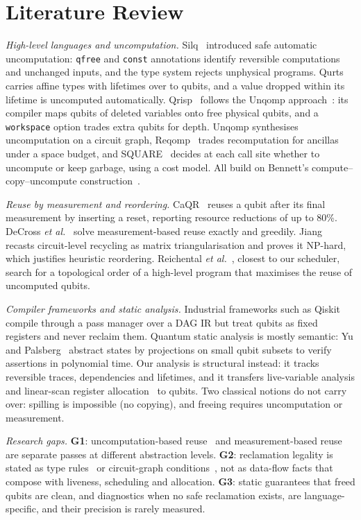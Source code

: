 \documentclass[conference,a4paper]{IEEEtran}
\begin{document}
\section{Literature Review}
\emph{High-level languages and uncomputation.} Silq~\cite{silq} introduced safe automatic uncomputation: \texttt{qfree} and \texttt{const} annotations identify reversible computations and unchanged inputs, and the type system rejects unphysical programs. Qurts~\cite{qurts} carries affine types with lifetimes over to qubits, and a value dropped within its lifetime is uncomputed automatically. Qrisp~\cite{qrisp} follows the Unqomp approach~\cite{unqomp}: its compiler maps qubits of deleted variables onto free physical qubits, and a \texttt{workspace} option trades extra qubits for depth. Unqomp synthesises uncomputation on a circuit graph, Reqomp~\cite{reqomp} trades recomputation for ancillas under a space budget, and SQUARE~\cite{square} decides at each call site whether to uncompute or keep garbage, using a cost model. All build on Bennett's compute--copy--uncompute construction~\cite{bennett1973}.

\emph{Reuse by measurement and reordering.} CaQR~\cite{caqr} reuses a qubit after its final measurement by inserting a reset, reporting resource reductions of up to 80\%. DeCross \emph{et al.}~\cite{decross2023} solve measurement-based reuse exactly and greedily. Jiang~\cite{jiang2024} recasts circuit-level recycling as matrix triangularisation and proves it NP-hard, which justifies heuristic reordering. Reichental \emph{et al.}~\cite{classiq2025}, closest to our scheduler, search for a topological order of a high-level program that maximises the reuse of uncomputed qubits.

\emph{Compiler frameworks and static analysis.} Industrial frameworks such as Qiskit~\cite{qiskit2024} compile through a pass manager over a DAG IR but treat qubits as fixed registers and never reclaim them. Quantum static analysis is mostly semantic: Yu and Palsberg~\cite{yupalsberg2021} abstract states by projections on small qubit subsets to verify assertions in polynomial time. Our analysis is structural instead: it tracks reversible traces, dependencies and lifetimes, and it transfers live-variable analysis and linear-scan register allocation~\cite{linearscan} to qubits. Two classical notions do not carry over: spilling is impossible (no copying), and freeing requires uncomputation or measurement.

\emph{Research gaps.} \textbf{G1}: uncomputation-based reuse~\cite{unqomp,reqomp,square,qrisp} and measurement-based reuse~\cite{caqr,decross2023,jiang2024} are separate passes at different abstraction levels. \textbf{G2}: reclamation legality is stated as type rules~\cite{silq,qurts} or circuit-graph conditions~\cite{unqomp}, not as data-flow facts that compose with liveness, scheduling and allocation. \textbf{G3}: static guarantees that freed qubits are clean, and diagnostics when no safe reclamation exists, are language-specific, and their precision is rarely measured.
\end{document}

